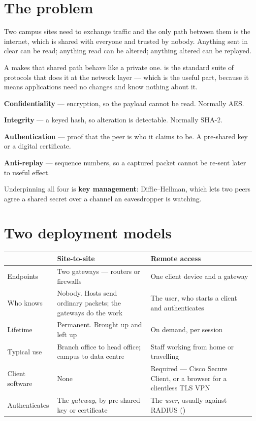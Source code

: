 \section{The problem}

Two campus sites need to exchange traffic and the only path between them is the
internet, which is shared with everyone and trusted by nobody. Anything sent in
clear can be read; anything read can be altered; anything altered can be replayed.

A  makes that shared path behave like a private
one.  is the standard suite of protocols that does it at the network
layer --- which is the useful part, because it means applications need no
changes and know nothing about it.

\begin{definitionbox}
\begin{tight}
  \item \textbf{Confidentiality} --- encryption, so the payload cannot be read.
        Normally AES.
  \item \textbf{Integrity} --- a keyed hash, so alteration is detectable.
        Normally SHA-2.
  \item \textbf{Authentication} --- proof that the peer is who it claims to be.
        A pre-shared key or a digital certificate.
  \item \textbf{Anti-replay} --- sequence numbers, so a captured packet cannot be
        re-sent later to useful effect.
\end{tight}
Underpinning all four is \textbf{key management}: Diffie--Hellman, which lets two
peers agree a shared secret over a channel an eavesdropper is watching.
\end{definitionbox}

\section{Two deployment models}

\begin{longtable}{@{}L{3.0cm}L{5.9cm}L{6.0cm}@{}}
\toprule
{}
\textbf{} & \textbf{Site-to-site} & \textbf{Remote access} \\
\midrule
\endhead
Endpoints & Two gateways --- routers or firewalls &
One client device and a gateway \\
Who knows & Nobody. Hosts send ordinary packets; the gateways do the work &
The user, who starts a client and authenticates \\
Lifetime & Permanent. Brought up and left up &
On demand, per session \\
Typical use & Branch office to head office; campus to data centre &
Staff working from home or travelling \\
Client software & None &
Required --- Cisco Secure Client, or a browser for a clientless TLS VPN \\
Authenticates & The \emph{gateway}, by pre-shared key or certificate &
The \emph{user}, usually against RADIUS () \\
\bottomrule
\end{longtable}

